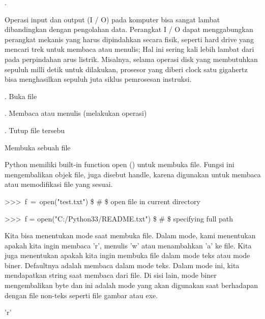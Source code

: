 . \par
Operasi input dan output (I / O) pada komputer bisa sangat lambat dibandingkan dengan pengolahan data. Perangkat I / O dapat menggabungkan perangkat mekanis yang harus dipindahkan secara fisik, seperti hard drive yang mencari trek untuk membaca atau menulis; Hal ini sering kali  lebih lambat dari pada perpindahan arus listrik. Misalnya, selama operasi disk yang membutuhkan sepuluh milli detik untuk dilakukan, prosesor yang diberi clock satu gigahertz bisa menghasilkan sepuluh juta siklus pemrosesan instruksi. \par
\vspace{12pt}
. \hspace*{0.5in} Buka file \par
{}. \hspace*{0.5in} Membaca atau menulis (melakukan operasi) \par
{}. \hspace*{0.5in} Tutup file tersebu \par
\vspace{12pt}
\vspace{12pt}
\vspace{12pt}
\noindent 
Membuka sebuah file \par
\noindent 
Python memiliki built-in function open () untuk membuka file. Fungsi ini mengembalikan objek file, juga disebut handle, karena digunakan untuk membaca atau memodifikasi file yang sesuai. \par
\vspace{12pt}
\noindent 
>>>~f~=~open("test.txt")     \$  \#  \$ open file in current directory \par
\noindent 
>>>~f = open("C:/Python33/README.txt")   \$  \#  \$ specifying full path \par
\vspace{12pt}
Kita bisa menentukan mode saat membuka file. Dalam mode, kami menentukan apakah kita ingin membaca 'r', menulis 'w' atau menambahkan 'a' ke file. Kita juga menentukan apakah kita ingin membuka file dalam mode teks atau mode biner. Defaultnya adalah membaca dalam mode teks. Dalam mode ini, kita mendapatkan string saat membaca dari file. Di sisi lain, mode biner mengembalikan byte dan ini adalah mode yang akan digunakan saat berhadapan dengan file non-teks seperti file gambar atau exe. \par
\vspace{12pt}
\vspace{12pt}
\noindent 
'r' \hspace*{0.5in}  \par
